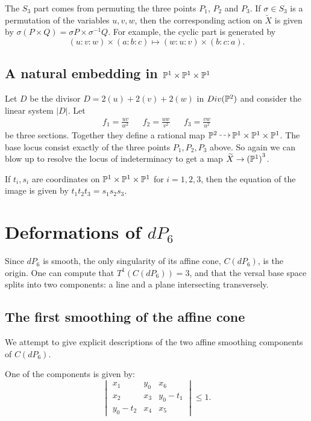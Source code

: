 \documentclass[11pt, english]{article}
\begin{document}
The $S_3$ part comes from permuting the three points $P_1$, $P_2$ and $P_3$. If $\sigma \in S_3$ is a permutation of the variables $u,v,w$, then the corresponding action on $\widetilde X$ is given by $\sigma (P \times Q)=\sigma P \times \sigma^{-1} Q$. For example, the cyclic part is generated by
$$
(u:v:w)\times (a:b:c) \mapsto (w:u:v) \times(b:c:a).
$$

\subsection{A natural embedding in $\mathbb{P}^1 \times \mathbb{P}^1 \times \mathbb{P}^1$}

Let $D$ be the divisor $D=2(u)+2(v)+2(w)$ in $Div(\mathbb{P}^2)$ and consider the linear system $\lvert D \rvert$. Let 
\begin{align*}
 f_1 = \frac{uv}{w^2} && f_2 = \frac{uw}{v^2} && f_3 = \frac{vw}{u^2}
\end{align*}
be three sections. Together they define a rational map $\PP^2 \rmap \PP^1 \times \PP^1 \times \PP^1$. The base locus consist exactly of the three points $P_1,P_2,P_3$ above. So again we can blow up to resolve the locus of indeterminacy to get a map $\widetilde X \to {(\mathbb{P}^1)}^3$.

If $t_i,s_i$ are coordinates on $\mathbb{P}^1 \times \mathbb{P}^1 \times \mathbb{P}^1$ for $i=1,2,3$, then the equation of the image is given by $t_1t_2t_3=s_1s_2s_3$. 

\section{Deformations of $dP_6$}

Since $dP_6$ is smooth, the only singularity of its affine cone, $C(dP_6)$, is the origin. One can compute that $T^1(C(dP_6))=3$, and that the versal base space splits into two components: a line and a plane intersecting transversely.

\subsection{The first smoothing of the affine cone}

We attempt to give explicit descriptions of the two affine smoothing components of $C(dP_6)$. 

One of the components is given by:
\[
\begin{vmatrix}
x_1 & y_0 & x_6 \\
x_2 & x_3 & y_0-t_1 \\
y_0-t_2 & x_4 & x_5
\end{vmatrix} \leq 1.
\]
\end{document}
